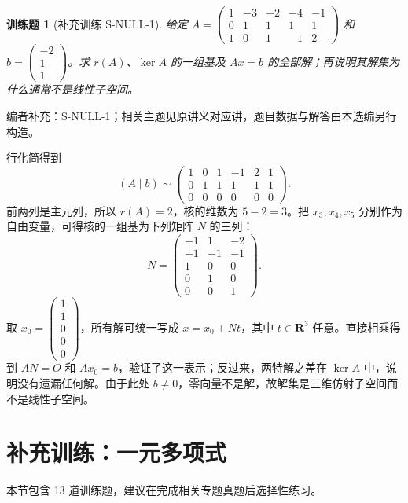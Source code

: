\documentclass[12pt,fontset=fandol]{ctexart}
\newtheorem{exercise}{训练题}[section]
\begin{document}
\begin{exercise}[补充训练 S-NULL-1]\label{prob:S-NULL-1}
给定 $A=\begin{pmatrix}1&-3&-2&-4&-1\\0&1&1&1&1\\1&0&1&-1&2\end{pmatrix}$ 和 $b=\begin{pmatrix}-2\\1\\1\end{pmatrix}$。求 $r(A)$、$\ker A$ 的一组基及 $Ax=b$ 的全部解；再说明其解集为什么通常不是线性子空间。
\end{exercise}
\noindent 编者补充：S-NULL-1；相关主题见原讲义对应讲，题目数据与解答由本选编另行构造。
\begin{solve}
行化简得到
\[(A\mid b)\sim \begin{pmatrix}1&0&1&-1&2&1\\0&1&1&1&1&1\\0&0&0&0&0&0\end{pmatrix}.\]
前两列是主元列，所以 $r(A)=2$，核的维数为 $5-2=3$。把 $x_3,x_4,x_5$ 分别作为自由变量，可得核的一组基为下列矩阵 $N$ 的三列：
\[N=\begin{pmatrix}-1&1&-2\\-1&-1&-1\\1&0&0\\0&1&0\\0&0&1\end{pmatrix}.\]
取 $x_0=\begin{pmatrix}1\\1\\0\\0\\0\end{pmatrix}$，所有解可统一写成 $x=x_0+Nt$，其中 $t\in\mathbf R^3$ 任意。直接相乘得到 $AN=O$ 和 $Ax_0=b$，验证了这一表示；反过来，两特解之差在 $\ker A$ 中，说明没有遗漏任何解。由于此处 $b\ne0$，零向量不是解，故解集是三维仿射子空间而不是线性子空间。
\end{solve}

\section{补充训练：一元多项式}

本节包含 13 道训练题，建议在完成相关专题真题后选择性练习。
\end{document}
